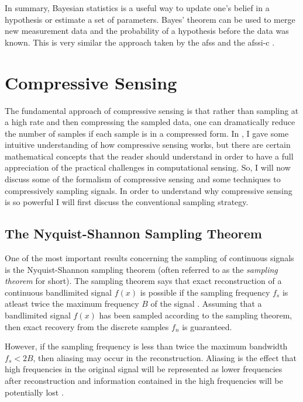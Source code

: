 In summary, Bayesian statistics is a useful way to update one's belief in a hypothesis or estimate a set of parameters. Bayes' theorem can be used to merge new measurement data and the probability of a hypothesis before the data was known. This is very similar the approach taken by the \gls{afss} and the \gls{afssi-c} \cite{dinakarababu2011adaptive, dunlop2016experimental}. 

\section{Compressive Sensing}

The fundamental approach of \gls{compressive sensing} is that rather than sampling at a high rate and then compressing the sampled data, one can dramatically reduce the number of samples if each sample is in a compressed form. In  , I gave some intuitive understanding of how \gls{compressive sensing} works, but there are certain mathematical concepts that the reader should understand in order to have a full appreciation of the practical challenges in computational sensing. So, I will now discuss some of the formalism of compressive sensing and some techniques to compressively sampling signals. In order to understand why compressive sensing is so powerful I will first discuss the conventional sampling strategy.

\subsection{The Nyquist-Shannon Sampling Theorem}

One of the most important results concerning the \gls{sampling} of continuous signals is the Nyquist-Shannon sampling theorem (often referred to as the \emph{sampling theorem} for short). The sampling theorem says that exact reconstruction of a continuous \gls{bandlimited signal} $f(x)$ is possible if the sampling frequency $f_s$ is atleast twice the maximum frequency $ B $ of the signal \cite{shannon1949communication}. Assuming that a bandlimited signal $f(x)$ has been sampled according to the sampling theorem, then exact recovery from the discrete samples $f_n$ is guaranteed.

However, if the sampling frequency is less than twice the maximum bandwidth $f_s < 2B$, then aliasing may occur in the reconstruction. Aliasing is the effect that high frequencies in the original signal will be represented as lower frequencies after reconstruction and information contained in the high frequencies will be potentially lost \cite{proakis1988introduction}. 

